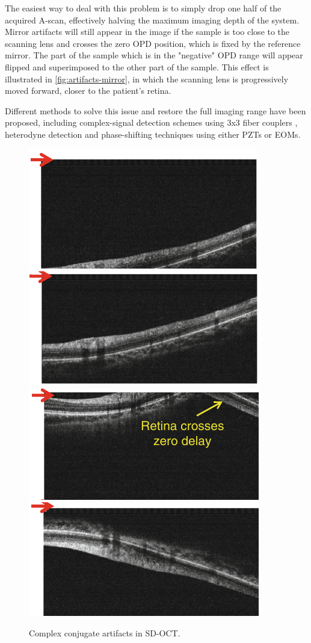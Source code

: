 The easiest way to deal with this problem is to simply drop one half of the acquired A-scan, effectively halving the maximum imaging depth of the system. Mirror artifacts will still appear in the image if the sample is too close to the scanning lens and crosses the zero \ac{OPD} position, which is fixed by the reference mirror. The part of the sample which is in the "negative" \ac{OPD} range will appear flipped and superimposed to the other part of the sample. This effect is illustrated in \autoref{fig:artifacts-mirror}, in which the scanning lens is progressively moved forward, closer to the patient's retina. 

Different methods to solve this issue and restore the full imaging range have been proposed, including complex-signal detection schemes using 3x3 fiber couplers \cite{Sarunic2005}, heterodyne detection \cite{Davis2005} and phase-shifting techniques \cite{Tao2007} using either \acp{PZT} or \acp{EOM}. 

\begin{figure}[bth]
	\myfloatalign
	{\includegraphics[width=.45\linewidth]{gfx/ch2/a}} \hspace{0.3cm}
    {\includegraphics[width=.45\linewidth]{gfx/ch2/b}} \\[0.5cm]
	{\includegraphics[width=.45\linewidth]{gfx/ch2/c}} \hspace{0.3cm}
	{\includegraphics[width=.45\linewidth]{gfx/ch2/d}}
	\caption{Complex conjugate artifacts in \ac{SD-OCT}.}\label{fig:artifacts-mirror}
\end{figure}




